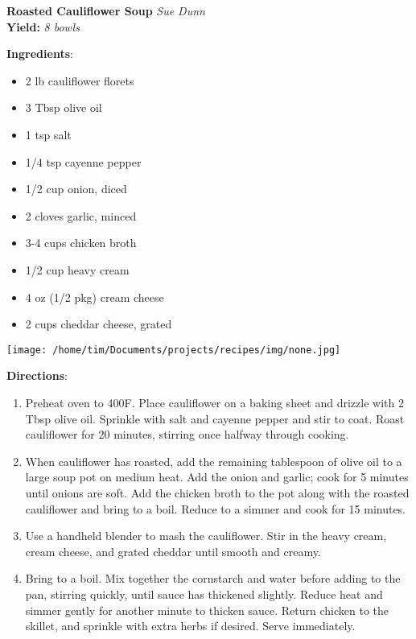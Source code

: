 \documentclass[11pt, twoside, openany]{book}
\begin{document}
\noindent\begin{minipage}[t]{\linewidth}%
{\Large\textbf{Roasted Cauliflower Soup}} \label{roasted-cauliflower-soup}\hfill\textit{Sue Dunn}\\
\textbf{Yield:} \textit{8 bowls}\\
\noindent\begin{minipage}[t]{0.78\linewidth}%
\textbf{Ingredients}:\vspace{-3mm}
\begin{multicols}{2}
\begin{itemize}\setlength\itemsep{-1mm}
\item 2 lb cauliflower florets
\item 3 Tbsp olive oil
\item 1 tsp salt
\item 1/4 tsp cayenne pepper
\item 1/2 cup onion, diced
\item 2 cloves garlic, minced
\item 3-4 cups chicken broth
\item 1/2 cup heavy cream
\item 4 oz (1/2 pkg) cream cheese
\item 2 cups cheddar cheese, grated
\end{itemize}
\end{multicols}
\end{minipage}
\noindent\begin{minipage}[t]{0.18\linewidth}
\centering \strut\vspace*{-\baselineskip}\newline
\texttt{[image: /home/tim/Documents/projects/recipes/img/none.jpg]}\\
\end{minipage}\vspace{3mm}
\textbf{Directions}:
\vspace{-3mm}\begin{enumerate}\setlength\itemsep{-1mm}
\item Preheat oven to 400F. Place cauliflower on a baking sheet and drizzle with 2 Tbsp olive oil. Sprinkle with salt and cayenne pepper and stir to coat. Roast cauliflower for 20 minutes, stirring once halfway through cooking.
\item When cauliflower has roasted, add the remaining tablespoon of olive oil to a large soup pot on medium heat. Add the onion and garlic; cook for 5 minutes until onions are soft. Add the chicken broth to the pot along with the roasted cauliflower and bring to a boil. Reduce to a simmer and cook for 15 minutes.
\item Use a handheld blender to mash the cauliflower. Stir in the heavy cream, cream cheese, and grated cheddar until smooth and creamy.
\item Bring to a boil. Mix together the cornstarch and water before adding to the pan, stirring quickly, until sauce has thickened slightly. Reduce heat and simmer gently for another minute to thicken sauce. Return chicken to the skillet, and sprinkle with extra herbs if desired. Serve immediately.
\end{enumerate}
\end{minipage}\vspace{8mm}
\end{document}
